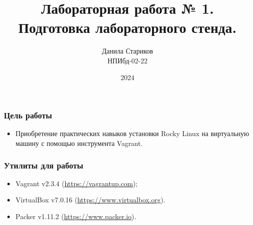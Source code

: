 

\title{Лабораторная работа № 1. \\ Подготовка лабораторного стенда.}
\author{Данила Стариков \\ НПИбд-02-22}
\date{2024}



\frame{\titlepage}

\begin{frame}
\frametitle{Цель работы}
\begin{itemize}
    \item Приобретение практических навыков установки Rocky Linux на виртуальную машину с помощью инструмента Vagrant.
\end{itemize}
\end{frame}

\begin{frame}
\frametitle{Утилиты для работы}
\begin{itemize}
    \item Vagrant v2.3.4 (\url{https://vagrantup.com});
    \item VirtualBox v7.0.16 (\url{https://www.virtualbox.org}).
    \item Packer v1.11.2 (\url{https://www.packer.io}).
\end{itemize}
\end{frame}

